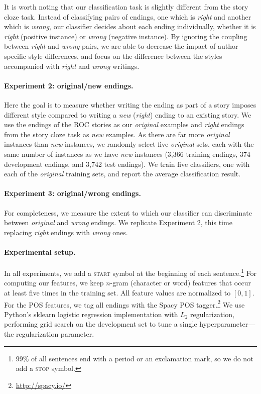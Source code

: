 \documentclass[11pt,a4paper]{article}
\begin{document}
It is worth noting that our classification task is slightly different from the story cloze task. 
Instead of classifying pairs of endings, one which is {\it right} and
another which is {\it wrong}, our classifier decides about each ending
individually, whether it is \emph{right} (positive instance) or
\emph{wrong} (negative instance).
By ignoring the coupling between {\it right} and {\it wrong} pairs, 
we are able to decrease the impact of author-specific style differences,
and focus on the difference between the styles accompanied with {\it right} and {\it wrong} writings.

\paragraph{Experiment 2: original/new endings.}

Here the goal is to measure whether writing the ending as part of a
story imposes different style compared to writing a {\it new} ({\it right}) ending to an existing story.
We use the endings of the ROC stories as our {\it original} examples and {\it right} endings from the story cloze task  as {\it new} examples.
As there are far more {\it original} instances than {\it new}
instances, we randomly select five  {\it original} sets, each with the same number of
instances as we have
\emph{new} instances (3,366 training endings, 374 development endings, and 3,742 test endings).
We train five classifiers, one with each of the {\it original} training sets, and report the average classification result.

\paragraph{Experiment 3: original/wrong endings.}
For completeness, we measure the extent to which our classifier can discriminate between {\it original} and {\it wrong} endings. We replicate Experiment 2, this time replacing {\it right} endings with {\it wrong} ones.


\paragraph{Experimental setup.}
In all experiments, we add a \textsc{start} symbol at the beginning
of each sentence.\footnote{99\% of all sentences end with a period
  or an exclamation mark, so we do not add a \textsc{stop} symbol.}
For computing our features, we keep $n$-gram (character or word) features that occur at least five times in the training set.
All feature values are normalized to $[0, 1]$.
For the POS features, we tag all endings with the Spacy POS tagger.\footnote{\url{http://spacy.io/}}
We use  Python's sklearn logistic regression implementation \cite{scikit-learn} with $L_2$
regularization, performing grid search on the development set to
tune a single hyperparameter---the regularization parameter.
\end{document}
